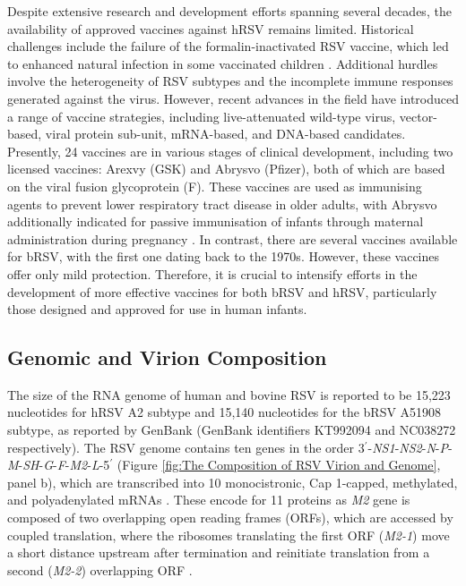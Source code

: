 Despite extensive research and development efforts spanning several decades, the availability of approved vaccines against hRSV remains limited. Historical challenges include the failure of the formalin-inactivated RSV vaccine, which led to enhanced natural infection in some vaccinated children \cite{Fulginiti1969RespiratoryVaccine., Kim1969RespiratoryVaccine.}. Additional hurdles involve the heterogeneity of RSV subtypes and the incomplete immune responses generated against the virus. However, recent advances in the field have introduced a range of vaccine strategies, including live-attenuated wild-type virus, vector-based, viral protein sub-unit, mRNA-based, and DNA-based candidates. Presently, 24 vaccines are in various stages of clinical development, including two licensed vaccines: Arexvy (GSK) and Abrysvo (Pfizer), both of which are based on the viral fusion glycoprotein (F). These vaccines are used as immunising agents to prevent lower respiratory tract disease in older adults, with Abrysvo additionally indicated for passive immunisation of infants through maternal administration during pregnancy \cite{Topalidou2023RespiratoryVaccines}. In contrast, there are several vaccines available for bRSV, with the first one dating back to the 1970s. However, these vaccines offer only mild protection. Therefore, it is crucial to intensify efforts in the development of more effective vaccines for both bRSV \cite{Ellis2017HowCattle} and hRSV, particularly those designed and approved for use in human infants.

\subsection{Genomic and Virion Composition} \label{subsec:Genomic and Virion Composition}
The size of the RNA genome of human and bovine RSV is reported to be 15,223 nucleotides for hRSV A2 subtype and 15,140 nucleotides for the bRSV A51908 subtype, as reported by GenBank (GenBank identifiers KT992094 and NC038272 respectively). The RSV genome contains ten genes in the order 3$^{\prime}$-\textit{NS1}-\textit{NS2}-\textit{N}-\textit{P}-\textit{M}-\textit{SH}-\textit{G}-\textit{F}-\textit{M2}-\textit{L}-5$^{\prime}$ (Figure \ref{fig:The Composition of RSV Virion and Genome}, panel b), which are transcribed into 10 monocistronic, Cap 1-capped, methylated, and polyadenylated mRNAs \cite{Collins2013RespiratoryDisease, Bohmwald2016HumanPathology}. These encode for 11 proteins as \textit{M2} gene is composed of two overlapping open reading frames (ORFs), which are accessed by coupled translation, where the ribosomes translating the first ORF (\textit{M2-1}) move a short distance upstream after termination and reinitiate translation from a second (\textit{M2-2}) overlapping ORF \cite{Gould2007CoupledPneumovirinae}.

